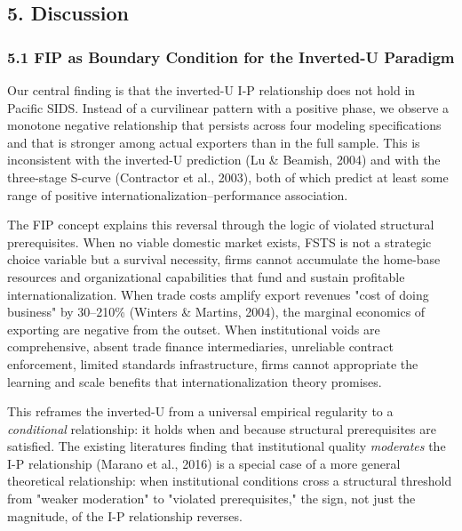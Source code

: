 \documentclass[12pt,a4paper]{article}
\begin{document}
\hypertarget{5-discussion}{%
\subsection{5. Discussion}\label{5-discussion}}

\hypertarget{51-fip-as-boundary-condition-for-the-inverted-u-paradigm}{%
\subsubsection{5.1 FIP as Boundary Condition for the Inverted-U
Paradigm}\label{51-fip-as-boundary-condition-for-the-inverted-u-paradigm}}

Our central finding is that the inverted-U I-P relationship does not
hold in Pacific SIDS. Instead of a curvilinear pattern with a positive
phase, we observe a monotone negative relationship that persists across
four modeling specifications and that is stronger among actual exporters
than in the full sample. This is inconsistent with the inverted-U
prediction (Lu \& Beamish, 2004) and with the three-stage S-curve
(Contractor et al., 2003), both of which predict at least some range of
positive internationalization--performance association.

The FIP concept explains this reversal through the logic of violated
structural prerequisites. When no viable domestic market exists, FSTS is
not a strategic choice variable but a survival necessity, firms cannot
accumulate the home-base resources and organizational capabilities that
fund and sustain profitable internationalization. When trade costs
amplify export revenues\textquotesingle{} "cost of doing business" by
30--210\% (Winters \& Martins, 2004), the marginal economics of
exporting are negative from the outset. When institutional voids are
comprehensive, absent trade finance intermediaries, unreliable contract
enforcement, limited standards infrastructure, firms cannot appropriate
the learning and scale benefits that internationalization theory
promises.

This reframes the inverted-U from a universal empirical regularity to a
\emph{conditional} relationship: it holds when and because structural
prerequisites are satisfied. The existing literature\textquotesingle s
finding that institutional quality \emph{moderates} the I-P relationship
(Marano et al., 2016) is a special case of a more general theoretical
relationship: when institutional conditions cross a structural threshold
from "weaker moderation" to "violated prerequisites," the sign, not just
the magnitude, of the I-P relationship reverses.
\end{document}
